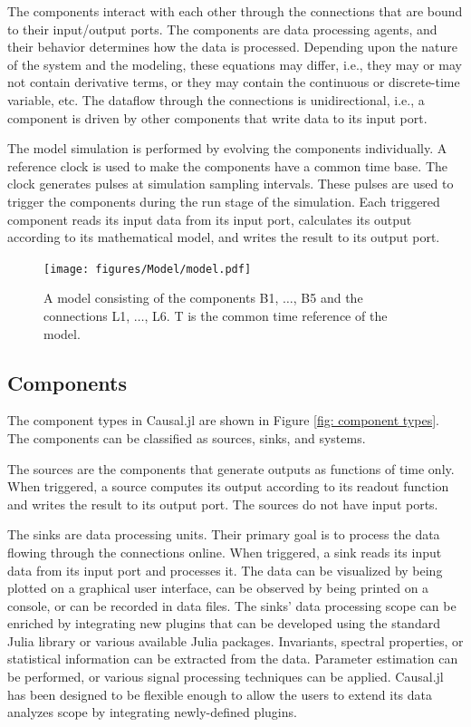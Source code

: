 \documentclass{juliacon}
\begin{document}
The components interact with each other through the connections that are bound to their input/output ports. The components are data processing agents, and their behavior determines how the data is processed. Depending upon the nature of the system and the modeling, these equations may differ, i.e., they may or may not contain derivative terms, or they may contain the continuous or discrete-time variable, etc. The dataflow through the connections is unidirectional, i.e., a component is driven by other components that write data to its input port.

The model simulation is performed by evolving the components individually. A reference clock is used to make the components have a common time base. The clock generates pulses at simulation sampling intervals. These pulses are used to trigger the components during the run stage of the simulation. Each triggered component reads its input data from its input port, calculates its output according to its mathematical model, and writes the result to its output port.

\begin{figure}
    \centering
    \texttt{[image: figures/Model/model.pdf]}
    \caption{A model consisting of the components B1, $\ldots$, B5 and the connections L1, $\ldots$, L6. T is the common time reference of the model.}
    \label{fig: simple model}
\end{figure}

\subsection{Components}

The component types in Causal.jl are shown in Figure \ref{fig: component types}. The components can be classified as sources, sinks, and systems.

The sources are the components that generate outputs as functions of time only. When triggered, a source computes its output according to its readout function and writes the result to its output port. The sources do not have input ports.

The sinks are data processing units. Their primary goal is to process the data flowing through the connections online. When triggered, a sink reads its input data from its input port and processes it. The data can be visualized by being plotted on a graphical user interface, can be observed by being printed on a console, or can be recorded in data files. The sinks' data processing scope can be enriched by integrating new plugins that can be developed using the standard Julia library or various available Julia packages. Invariants, spectral properties, or statistical information can be extracted from the data. Parameter estimation can be performed, or various signal processing techniques can be applied. Causal.jl has been designed to be flexible enough to allow the users to extend its data analyzes scope by integrating newly-defined plugins.
\end{document}
